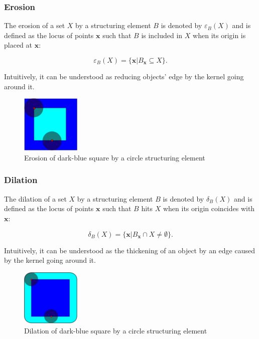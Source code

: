 \subsubsection{Erosion}

The erosion of a set $X$ by a structuring element $B$ is denoted by $\varepsilon_B(X)$ and is defined as the locus of points $\mathbf{x}$ such that $B$ is included in $X$ when its origin is placed at $\mathbf{x}$:

\begin{equation}
    \varepsilon_B(X) = \{ \mathbf{x} | B_\mathbf{x} \subseteq X \}.
\end{equation}

Intuitively, it can be understood as reducing objects' edge by the kernel going around it.

\begin{figure}[H]
    \centering
    \includegraphics[width=0.25\textwidth]{Content/Images/Erosion.png}
    \caption{Erosion of dark-blue square by a circle structuring element \cite{erosion}}
\end{figure}

\subsubsection{Dilation}

The dilation of a set $X$ by a structuring element $B$ is denoted by $\delta_B(X)$ and is defined as the locus of points $\mathbf{x}$ such that $B$ hits $X$ when its origin coincides with $\mathbf{x}$:

\begin{equation}
    \delta_B(X) = \{ \mathbf{x} | B_\mathbf{x} \cap X \neq \emptyset \}.
\end{equation}

Intuitively, it can be understood as the thickening of an object by an edge caused by the kernel going around it.

\begin{figure}[H]
    \centering
    \includegraphics[width=0.25\textwidth]{Content/Images/Dilation.png}
    \caption{Dilation of dark-blue square by a circle structuring element \cite{dilation}}
\end{figure}

